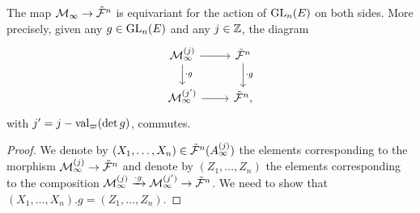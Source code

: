 \documentclass[../main.tex]{subfiles}
\begin{document}
\begin{lem}\label{lem:EquivarianceForGLn}
    The map $\mathcal{M}_\infty \to \tilde {\mathcal{F}}^n$ is equivariant 
    for the action of $\operatorname{GL}_n(E)$ on both sides. More precisely,
    given any $g \in \operatorname{GL}_n(E)$ and any $j \in \mathbb{Z}$, the diagram
    \begin{equation*}
        \begin{tikzcd}[ampersand replacement=\&]
        	{\cM_\infty^{(j)}} \& {\tilde \cF^n} \\
        	{\cM_\infty^{(j')}} \& {\tilde \cF^n},
        	\arrow[from=1-1, to=1-2]
        	\arrow["{\cdot g}", from=1-1, to=2-1]
        	\arrow["{\cdot g}", from=1-2, to=2-2]
        	\arrow[from=2-1, to=2-2]
        \end{tikzcd}
    \end{equation*}
    with $j' = j - \mathrm{val}_\varpi(\det g)$, commutes.
\begin{proof}
    We denote by $(X_1, \dots, X_n) \in \tilde {\mathcal{F}}^n(A_\infty^{(j)})$
    the elements corresponding to the morphism
    $\mathcal{M}_\infty^{(j)} \to \tilde {\mathcal{F}}^n$ and denote by 
    $(Z_1, \dots, Z_n)$ the elements corresponding to the composition
    $\mathcal{M}_\infty^{(j)} \xrightarrow{\cdot g} \mathcal{M}_\infty^{(j')} \to \tilde {\mathcal{F}}^n$.
    We need to show that $(X_1, \dots, X_n).g = (Z_1, \dots, Z_n)$.


\end{proof}
\end{lem}
\end{document}
